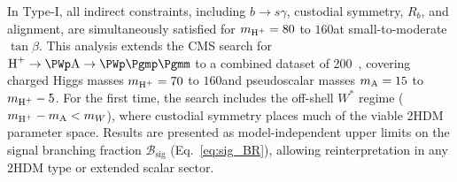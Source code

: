 In Type-I, all indirect constraints, including $b \to s\gamma$, custodial symmetry, $R_b$, and alignment, are simultaneously satisfied for $m_{\text{H}^+} = 80$ to $160$\GeV at small-to-moderate $\tan\beta$. This analysis extends the CMS search for $\PHp \to \PWp \PA \to \PWp \Pgmp\Pgmm$ to a combined dataset of 200~\fbinv, covering charged Higgs masses $m_{\text{H}^+} = 70$ to $160$\GeV and pseudoscalar masses $m_{\text{A}} = 15$ to $m_{\text{H}^+} - 5$\GeV. For the first time, the search includes the off-shell $W^*$ regime ($m_{\text{H}^+} - m_{\text{A}} < m_W$), where custodial symmetry places much of the viable 2HDM parameter space. Results are presented as model-independent upper limits on the signal branching fraction $\mathcal{B}_{\text{sig}}$ (Eq.~\ref{eq:sig_BR}), allowing reinterpretation in any 2HDM type or extended scalar sector.

